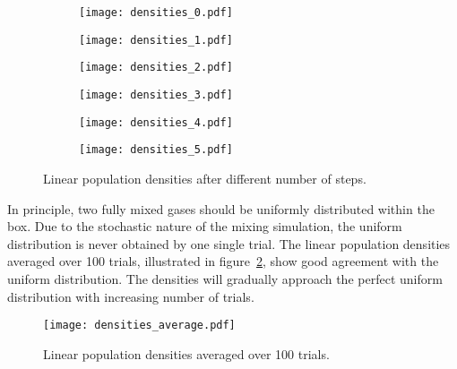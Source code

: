 \documentclass{article}
\begin{document}
\begin{figure}[h!]
\centering
\begin{subfigure}[b]{0.32\textwidth}
\texttt{[image: densities\_0.pdf]}
\end{subfigure}
\begin{subfigure}[b]{0.32\textwidth}
\texttt{[image: densities\_1.pdf]}
\end{subfigure}
\begin{subfigure}[b]{0.32\textwidth}
\texttt{[image: densities\_2.pdf]}
\end{subfigure}
\begin{subfigure}[b]{0.32\textwidth}
\texttt{[image: densities\_3.pdf]}
\end{subfigure}
\begin{subfigure}[b]{0.32\textwidth}
\texttt{[image: densities\_4.pdf]}
\end{subfigure}
\begin{subfigure}[b]{0.32\textwidth}
\texttt{[image: densities\_5.pdf]}
\end{subfigure}
\caption{Linear population densities after different number of steps.}
\label{densities}
\end{figure}

In principle, two fully mixed gases should be uniformly distributed within the box. Due to the stochastic nature of the mixing simulation, the uniform distribution is never obtained by one single trial. The linear population densities averaged over 100 trials, illustrated in figure~\ref{average100}, show good agreement with the uniform distribution. The densities will gradually approach the perfect uniform distribution with increasing number of trials.

\begin{figure}[h!]
\centering
\texttt{[image: densities\_average.pdf]}
\caption{Linear population densities averaged over 100 trials.}
\label{average100}
\end{figure}
\end{document}
